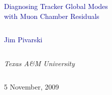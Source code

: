 \documentclass[compress]{beamer}
\begin{document}
\begin{frame}
\vfill
\begin{center}
\textcolor{darkblue}{\Large Diagnosing Tracker Global Modes \\ \vspace{0.25 cm} with Muon Chamber Residuals}

\vfill
\begin{columns}
\begin{center}
\large
\textcolor{darkblue}{Jim Pivarski}
\end{center}
\end{columns}

\begin{columns}
\begin{center}
\scriptsize
{\it Texas A\&M University}
\end{center}
\end{columns}

\vfill
5 November, 2009

\end{center}
\end{frame}


\small
\end{document}
